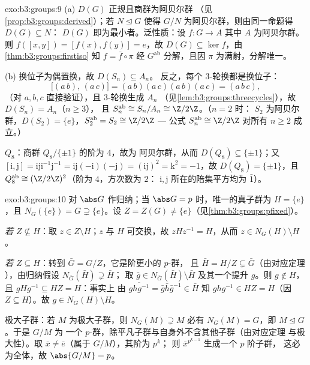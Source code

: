 \begin{solution}{exo:b3:groups:9}
(a) $D(G)$ 正规且商群为阿贝尔群
（见\cref{prop:b3:groups:derived}）；若 $N \trianglelefteq G$ 使得
$G/N$ 为阿贝尔群，则由同一命题得 $D(G) \subseteq N$：
$D(G)$ 即为最小者。泛性质：设 $f \colon G \to A$
其中 $A$ 为阿贝尔群。则 $f([x,y]) = [f(x), f(y)] = e$，故 $D(G)
\subseteq \ker f$，由\cref{thm:b3:groups:firstiso} 知 $f =
\bar f \circ \pi$ 经 $G^{\mathrm{ab}}$ 分解，且因 $\pi$
为满射，分解唯一。

(b) 换位子为偶置换，故 $D(S_n) \subseteq A_n$。
反之，每个 $3$-轮换都是换位子：
\[
\bigl[(a\,b),\,(a\,c)\bigr] = (a\,b)(a\,c)(a\,b)(a\,c) =
(a\,b\,c),
\]
（对 $a, b, c$ 直接验证），且 $3$-轮换生成 $A_n$
（见\cref{lem:b3:groups:threecycles}），故 $D(S_n) = A_n$（$n \geq 3$），
且 $S_n^{\mathrm{ab}} \cong S_n/A_n \cong \Z/2\Z$。（$n = 2$ 时：
$S_2$ 为阿贝尔群，$D(S_2) = \{e\}$，$S_2^{\mathrm{ab}} = S_2
\cong \Z/2\Z$ --- 公式 $S_n^{\mathrm{ab}} \cong \Z/2\Z$
对所有 $n \geq 2$ 成立。）

$Q_8$：商群 $Q_8/\{\pm 1\}$ 的阶为 $4$，故为
阿贝尔群，从而 $D(Q_8) \subseteq \{\pm 1\}$；又 $[\mathrm i, \mathrm
j] = \mathrm i \mathrm j \mathrm i^{-1}\mathrm j^{-1} = \mathrm
i\mathrm j(-\mathrm i)(-\mathrm j) = (\mathrm i \mathrm j)^2 =
\mathrm k^2 = -1$，故 $D(Q_8) = \{\pm 1\}$，且
$Q_8^{\mathrm{ab}} \cong (\Z/2\Z)^2$（阶为 $4$，方次数为 $2$：
$\mathrm i, \mathrm j$ 所在的陪集平方均为 $\bar 1$）。
\end{solution}

\begin{solution}{exo:b3:groups:10}
对 $\abs G$ 作归纳；当 $\abs G = p$ 时，唯一的真子群为
$H = \{e\}$，且 $N_G(\{e\}) = G \supsetneq
\{e\}$。设 $Z = Z(G) \neq \{e\}$（见\cref{thm:b3:groups:pfixed}）。

\emph{若 $Z \not\subseteq H$}：取 $z \in Z \setminus H$；$z$
与 $H$ 可交换，故 $zHz^{-1} = H$，从而 $z \in N_G(H) \setminus
H$。

\emph{若 $Z \subseteq H$}：转到 $\bar G = G/Z$，它是阶更小的 $p$-群，
且 $\bar H = H/Z \subsetneq \bar G$（由对应定理
），由归纳假设 $N_{\bar G}(\bar H) \supsetneq \bar H$；
取 $\bar g \in N_{\bar G}(\bar H) \setminus \bar H$ 及其一个提升
$g$。则 $g \notin H$，且 $gHg^{-1} \subseteq HZ = H$：事实上
由 $\overline{ghg^{-1}} = \bar g \bar h \bar g^{-1} \in \bar H$ 知
$ghg^{-1} \in HZ = H$（因 $Z \subseteq H$）。故 $g \in
N_G(H)\setminus H$。

极大子群：若 $M$ 为极大子群，则 $N_G(M) \supsetneq M$
必有 $N_G(M) = G$，即 $M \trianglelefteq G$。于是 $G/M$ 为
一个 $p$-群，除平凡子群与自身外不含其他子群（由对应定理
与极大性）。取 $\bar x \neq \bar e$（属于 $G/M$），其阶为 $p^k$；
则 $\bar x^{p^{k-1}}$ 生成一个 $p$ 阶子群，
这必为全体，故 $\abs{G/M} = p$。
\end{solution}

